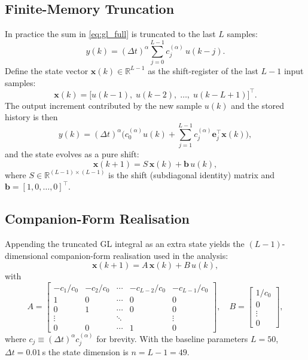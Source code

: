 \documentclass[11pt,a4paper]{article}
\theoremstyle{definition}
\begin{document}
\subsection{Finite-Memory Truncation}

In practice the sum in \eqref{eq:gl_full} is truncated to the last $L$
samples:
\begin{equation}
  y(k) = (\Delta t)^{\alpha}\sum_{j=0}^{L-1} c_j^{(\alpha)}\, u(k-j).
  \label{eq:gl_trunc}
\end{equation}
Define the state vector $\bm{x}(k) \in \mathbb{R}^{L-1}$ as the shift-register
of the last $L-1$ input samples:
\begin{equation}
  \bm{x}(k) = \bigl[u(k-1),\; u(k-2),\; \ldots,\; u(k-L+1)\bigr]^{\top}.
  \label{eq:state_def}
\end{equation}
The output increment contributed by the new sample $u(k)$ and the stored
history is then
\begin{equation}
  y(k) = (\Delta t)^{\alpha}
  \bigl(c_0^{(\alpha)} u(k)
        + \textstyle\sum_{j=1}^{L-1} c_j^{(\alpha)} \bm{e}_j^{\top}\bm{x}(k)\bigr),
\end{equation}
and the state evolves as a pure shift:
\begin{equation}
  \bm{x}(k+1) = S\,\bm{x}(k) + \bm{b}\,u(k),
\end{equation}
where $S \in \mathbb{R}^{(L-1)\times(L-1)}$ is the shift (subdiagonal
identity) matrix and $\bm{b} = [1,0,\ldots,0]^{\top}$.

\subsection{Companion-Form Realisation}

Appending the truncated GL integral as an extra state yields the
$(L-1)$-dimensional companion-form realisation used in the analysis:
\begin{equation}
  \bm{x}(k+1) = A\,\bm{x}(k) + B\,u(k),
  \label{eq:ss}
\end{equation}
with
\begin{equation}
  A =
  \begin{bmatrix}
    -c_1/c_0 & -c_2/c_0 & \cdots & -c_{L-2}/c_0 & -c_{L-1}/c_0 \\
    1        &  0        & \cdots &  0            &  0            \\
    0        &  1        & \cdots &  0            &  0            \\
    \vdots   &           & \ddots &               &  \vdots       \\
    0        &  0        & \cdots &  1            &  0
  \end{bmatrix},
  \quad
  B =
  \begin{bmatrix}
    1/c_0 \\ 0 \\ \vdots \\ 0
  \end{bmatrix},
  \label{eq:AB}
\end{equation}
where $c_j \equiv (\Delta t)^{\alpha} c_j^{(\alpha)}$ for brevity.  With the
baseline parameters $L = 50$, $\Delta t = 0.01$\,s the state dimension is
$n = L - 1 = 49$.
\end{document}
